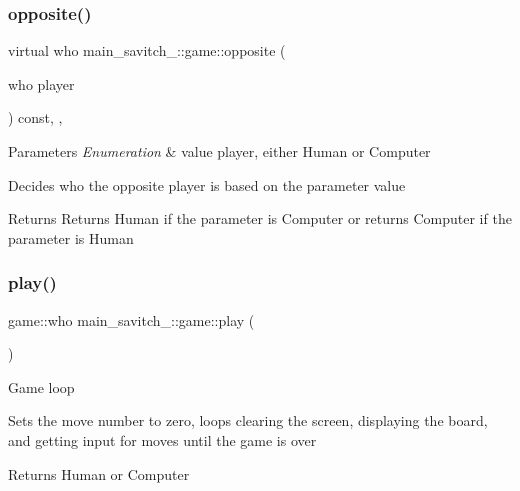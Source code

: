 \subsubsection{\texorpdfstring{opposite()}{opposite()}}
{\footnotesize\ttfamily virtual who main\+\_\+savitch\+\_\+::game\+::opposite (\begin{DoxyParamCaption}\item[{who}]{player }\end{DoxyParamCaption}) const\hspace{0.3cm}{\ttfamily [inline]}, {\ttfamily [protected]}, {\ttfamily [virtual]}}


\begin{DoxyParams}{Parameters}
{\em Enumeration} & value player, either Human or Computer\\
\hline
\end{DoxyParams}
Decides who the opposite player is based on the parameter value \begin{DoxyReturn}{Returns}
Returns Human if the parameter is Computer or returns Computer if the parameter is Human 
\end{DoxyReturn}
\mbox{\label{classmain__savitch__14_1_1game_a4dbeaddb78059f7c5dcbf5cc4e026317}} 
\subsubsection{\texorpdfstring{play()}{play()}}
{\footnotesize\ttfamily game\+::who main\+\_\+savitch\+\_\+::game\+::play (\begin{DoxyParamCaption}{ }\end{DoxyParamCaption})}

Game loop

Sets the move number to zero, loops clearing the screen, displaying the board, and getting input for moves until the game is over \begin{DoxyReturn}{Returns}
Human or Computer 
\end{DoxyReturn}
\mbox{\label{classmain__savitch__14_1_1game_ad521a7d78e7c163a0bc28b709f0d45fd}} 
